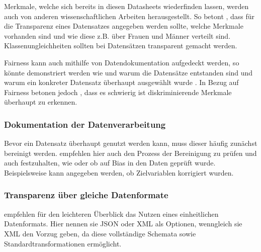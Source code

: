 Merkmale, welche sich bereits in diesen Datasheets wiederfinden lassen, werden auch von anderen wissenschaftlichen Arbeiten herausgestellt. So betont \cite{de2018algorithmic}, dass für die Transparenz eines Datensatzes angegeben werden sollte, welche Merkmale vorhanden sind und wie diese z.B. über Frauen und Männer verteilt sind. Klassenungleichheiten sollten bei Datensätzen transparent gemacht werden.

Fairness kann auch mithilfe von Datendokumentation aufgedeckt werden, so könnte demonstriert werden wie und warum die Datensätze entstanden sind und warum ein konkreter Datensatz überhaupt ausgewählt wurde \cite{denton2020bringing}. In Bezug auf Fairness betonen jedoch \cite{de2018algorithmic}, dass es schwierig ist diskriminierende Merkmale überhaupt zu erkennen.

\subsubsection{Dokumentation der Datenverarbeitung}
Bevor ein Datensatz überhaupt genutzt werden kann, muss dieser häufig zunächst bereinigt werden. \cite{garbin2022assessing} empfehlen hier auch den Prozess der Bereinigung zu prüfen und auch festzuhalten, wie oder ob auf Bias in den Daten geprüft wurde. Beispielsweise kann angegeben werden, ob Zielvariablen korrigiert wurden.

\subsubsection{Transparenz über gleiche Datenformate}
\cite{huvc2021anomaly} empfehlen für den leichteren Überblick das Nutzen eines einheitlichen Datenformats. Hier nennen sie JSON oder XML als Optionen, wenngleich sie XML den Vorzug geben, da diese vollständige Schemata sowie Standardtransformationen ermöglicht.